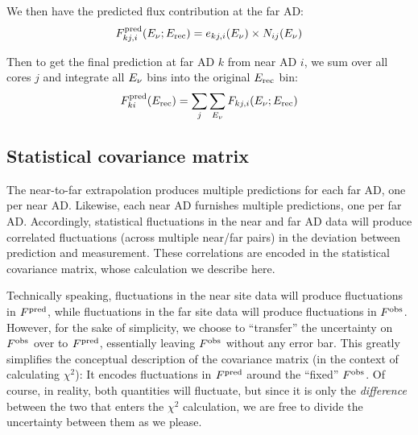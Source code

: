 \documentclass[../thesis.tex]{subfiles}
\begin{document}
We then have the predicted flux contribution at the far AD:
\begin{equation*}
  F^{\mathrm{pred}}_{kj,i}(E_\mathrm{\nu}; E_\mathrm{rec}) = e_{kj,i}(E_\mathrm{\nu}) \times N_{ij}(E_\mathrm{\nu})
\end{equation*}

Then to get the final prediction at far AD $k$ from near AD $i$, we sum over all cores $j$ and integrate all $E_\mathrm{\nu}$ bins into the original $E_\mathrm{rec}$ bin:
\begin{equation*}
  F^{\mathrm{pred}}_{ki}(E_\mathrm{rec}) = \sum_j \sum_{E_\mathrm{\nu}} F_{kj,i}(E_\mathrm{\nu}; E_\mathrm{rec})
\end{equation*}

\begin{comment}
Near site spectrum divided into Erec bins.

For each bin, convert to true energy using matrix.

For each true energy bin (from this single Erec bin), determine fraction from each core using baselines and power.

For each core, undo 1/L^2 and oscillation, then apply them for each far site

Sum up cores, repeat for all Etrue bins (still for this single Erec bin)

Integrate back into original Erec bin at far site. Repeat for all bins.

In this way we get 16 predictions.
\end{comment}

\subsection{Statistical covariance matrix}
\label{sec:fitStatCovMat}

The near-to-far extrapolation produces multiple predictions for each far AD, one per near AD. Likewise, each near AD furnishes multiple predictions, one per far AD. Accordingly, statistical fluctuations in the near and far AD data will produce correlated fluctuations (across multiple near/far pairs) in the deviation between prediction and measurement. These correlations are encoded in the statistical covariance matrix, whose calculation we describe here.

Technically speaking, fluctuations in the near site data will produce fluctuations in $F^{\mathrm{pred}}$, while fluctuations in the far site data will produce fluctuations in $F^{\mathrm{obs}}$. However, for the sake of simplicity, we choose to ``transfer'' the uncertainty on $F^{\mathrm{obs}}$ over to $F^{\mathrm{pred}}$, essentially leaving $F^{\mathrm{obs}}$ without any error bar. This greatly simplifies the conceptual description of the covariance matrix (in the context of calculating $\chi^2$): It encodes fluctuations in $F^{\mathrm{pred}}$ around the ``fixed'' $F^{\mathrm{obs}}$. Of course, in reality, both quantities will fluctuate, but since it is only the \emph{difference} between the two that enters the $\chi^2$ calculation, we are free to divide the uncertainty between them as we please.
\end{document}
